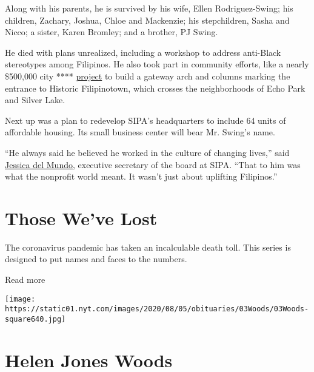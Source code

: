 Along with his parents, he is survived by his wife, Ellen
Rodriguez-Swing; his children, Zachary, Joshua, Chloe and Mackenzie; his
stepchildren, Sasha and Nicco; a sister, Karen Bromley; and a brother,
PJ Swing.

He died with plans unrealized, including a workshop to address
anti-Black stereotypes among Filipinos. He also took part in community
efforts, like a nearly \$500,000 city ****
\href{https://www.theeastsiderla.com/neighborhoods/historic_filipinotown/plans-unveiled-for-452-000-gateway-to-historic-filipinotown/article_096736f6-ad28-11ea-8a45-d34c6d8d6822.html\#:~:text=\%22Historic\%20Filipinotown\%20will\%20have\%20a,\%2C\%22\%20O'Farrell\%20said.\&text=Designed\%20by\%20Filipino\%20artist\%20Eliseo,Gabay\%3A\%20Our\%20Guiding\%20Star.\%E2\%80\%9D}{project}
to build a gateway arch and columns marking the entrance to Historic
Filipinotown, which crosses the neighborhoods of Echo Park and Silver
Lake.

Next up was a plan to redevelop SIPA's headquarters to include 64 units
of affordable housing. Its small business center will bear Mr. Swing's
name.

``He always said he believed he worked in the culture of changing
lives,'' said \href{https://sipacares.org/about/board/}{Jessica del
Mundo}, executive secretary of the board at SIPA. ``That to him was what
the nonprofit world meant. It wasn't just about uplifting Filipinos.''

\href{https://www.nytimes.com/interactive/2020/obituaries/people-died-coronavirus-obituaries.html?action=click\&pgtype=Article\&state=default\&region=BELOW_MAIN_CONTENT\&context=covid_obits_promo}{}

\hypertarget{those-weve-lost}{%
\section{Those We've Lost}\label{those-weve-lost}}

The coronavirus pandemic has taken an incalculable death toll. This
series is designed to put names and faces to the numbers.

Read more

\texttt{[image: https://static01.nyt.com/images/2020/08/05/obituaries/03Woods/03Woods-square640.jpg]}

\hypertarget{helen-jones-woods}{%
\section{Helen Jones Woods}\label{helen-jones-woods}}

